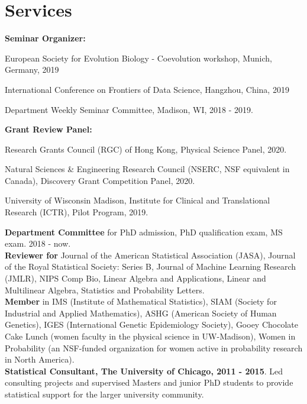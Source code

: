 \documentclass[letterpaper]{article}
\renewenvironment{itemize}{
  \begin{list}{}{
    \setlength{\leftmargin}{1.5em}
  }
}{
  \end{list}
}
\begin{document}
\section*{Services}

{\bf Seminar Organizer:} 
\begin{itemize}
\item European Society for Evolution Biology - Coevolution workshop, Munich, Germany, 2019
\item International Conference on Frontiers of Data Science, Hangzhou, China, 2019
\item Department Weekly Seminar Committee, Madison, WI, 2018 - 2019.
\end{itemize}

{\bf Grant Review Panel:} 
\begin{itemize}
\item Research Grants Council (RGC) of Hong Kong, Physical Science Panel, 2020. 
\item Natural Sciences \& Engineering Research Council (NSERC, NSF equivalent in Canada), Discovery Grant Competition Panel, 2020.
\item University of Wisconsin Madison, Institute for Clinical and Translational Research (ICTR), Pilot Program, 2019.
\end{itemize}

{\bf Department Committee} for PhD admission, PhD qualification exam, MS exam. 2018 - now. \\


{\bf Reviewer for} Journal of the American Statistical Association (JASA), Journal of the Royal Statistical Society: Series B, Journal of Machine Learning Research (JMLR), NIPS Comp Bio, Linear Algebra and Applications, Linear and Multilinear Algebra, Statistics and Probability Letters.\\

{\bf Member} in IMS (Institute of Mathematical Statistics), SIAM (Society for Industrial and Applied Mathematics), ASHG (American Society of Human Genetics), IGES (International Genetic Epidemiology Society), Gooey Chocolate Cake Lunch (women faculty in the physical science in UW-Madison), Women in Probability (an NSF-funded organization for women active in probability research in North America). \\

{\bf Statistical Consultant, The University of Chicago, 2011 - 2015}. Led consulting projects and supervised Masters and junior PhD students to provide statistical support for the larger university community.  
\end{document}
